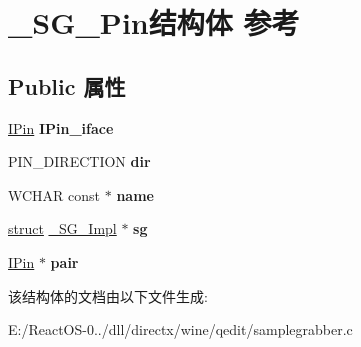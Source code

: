 \hypertarget{struct___s_g___pin}{}\section{\+\_\+\+S\+G\+\_\+\+Pin结构体 参考}
\label{struct___s_g___pin}
\subsection*{Public 属性}
\begin{DoxyCompactItemize}
\item 
\mbox{\label{struct___s_g___pin_ae03543f82d68b9c48e5738bdaf54d44f}} 
\hyperlink{interface_i_pin}{I\+Pin} {\bfseries I\+Pin\+\_\+iface}
\item 
\mbox{\label{struct___s_g___pin_a51188000e8f54e94ceb9159bb56a439c}} 
P\+I\+N\+\_\+\+D\+I\+R\+E\+C\+T\+I\+ON {\bfseries dir}
\item 
\mbox{\label{struct___s_g___pin_a4410738cf7d6ecf691ec5e308b9939a3}} 
W\+C\+H\+AR const  $\ast$ {\bfseries name}
\item 
\mbox{\label{struct___s_g___pin_a34afbf0c87b71304c139b16fc3cf6f30}} 
\hyperlink{interfacestruct}{struct} \hyperlink{struct___s_g___impl}{\+\_\+\+S\+G\+\_\+\+Impl} $\ast$ {\bfseries sg}
\item 
\mbox{\label{struct___s_g___pin_a1913c652f8de5cd5e7ade97293ca48fb}} 
\hyperlink{interface_i_pin}{I\+Pin} $\ast$ {\bfseries pair}
\end{DoxyCompactItemize}


该结构体的文档由以下文件生成\+:\begin{DoxyCompactItemize}
\item 
E\+:/\+React\+O\+S-\/0../dll/directx/wine/qedit/samplegrabber.\+c\end{DoxyCompactItemize}
